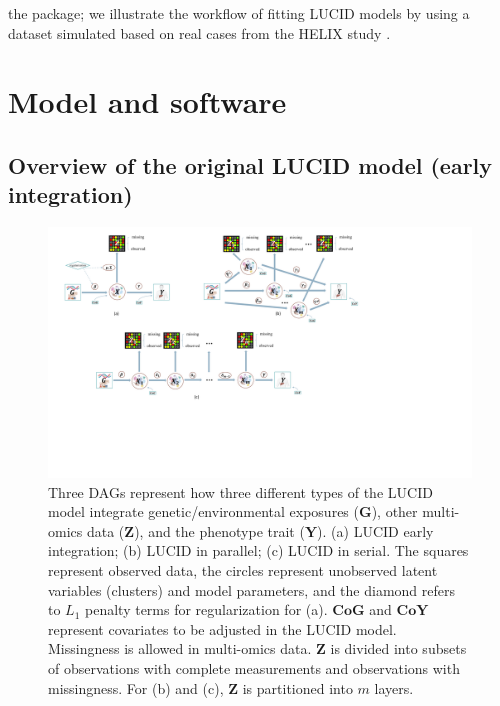 the  package; we illustrate the workflow of fitting LUCID models by using a dataset simulated based on real cases from the HELIX study \citep{vrijheid2014human, maitre2022state}.
\section{Model and software} \label{sec2}
\subsection{Overview of the original LUCID model (early integration)} \label{sec2.1}
\begin{figure}
    \centering
    \includegraphics[scale = 0.31]{figures/fig1.pdf}
    \caption{Three DAGs represent how three different types of the LUCID model integrate genetic/environmental exposures ($\bm G$), other multi-omics data ($\bm Z$), and the phenotype trait ($\bm Y$). (a) LUCID early integration; (b) LUCID in parallel; (c) LUCID in serial. The squares represent observed data, the circles represent unobserved latent variables (clusters) and model parameters, and the diamond refers to $L_1$ penalty terms for regularization for (a). $\bm {CoG}$ and $\bm {CoY}$ represent covariates to be adjusted in the LUCID model. Missingness is allowed in multi-omics data. $\bm Z$ is divided into subsets of observations with complete measurements and observations with missingness. For (b) and (c), $\bm Z$ is partitioned into $m$ layers.}
    \label{fig1}
\end{figure}
